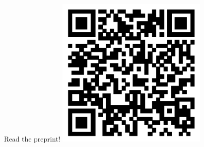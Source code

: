 \documentclass[final]{beamer}
\begin{document}
\begin{frame}{}
\begin{textblock}{18}
\begin{block}{Read the preprint!}
\centering
\includegraphics[width=0.55\textwidth]{arxiv-url.eps}
%

\end{block}


\end{textblock}
\end{frame}
\end{document}
